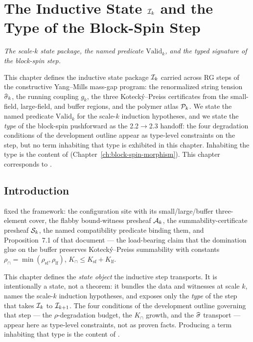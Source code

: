 %

\chapter{The Inductive State \texorpdfstring{$\mathcal{I}_k$}{I\_k}
  and the Type of the Block-Spin Step}
\label{ch:inductive-state}

\noindent\emph{The scale-$k$ state package, the named predicate
$\mathrm{Valid}_k$, and the typed signature of the block-spin step.}

This chapter defines the inductive state package $\mathcal{I}_k$ carried
across RG steps of the constructive Yang--Mills mass-gap program:
the renormalized string tension $\widehat{\sigma}_k$, the running coupling
$g_k$, the three Kotecký--Preiss certificates from the small-field,
large-field, and buffer regions, and the polymer atlas $\mathcal{P}_k$.
We state the named predicate $\mathrm{Valid}_k$ for the scale-$k$
induction hypotheses, and we state the \emph{type} of the block-spin
pushforward as the 2.2$\to$2.3 handoff: the four degradation
conditions of the development outline appear as type-level
constraints on the step, but no term inhabiting that type is
exhibited in this chapter.  Inhabiting the type is the content of
 (Chapter~\ref{ch:block-spin-morphism}).  This chapter
corresponds to .

\section{Introduction}
\label{sec:inductive-intro}

 fixed the framework: the configuration site with its small/large/buffer three-element cover, the flabby bound-witness presheaf $\mathcal{A}_k$, the summability-certificate presheaf $\mathcal{S}_k$, the named compatibility predicate binding them, and Proposition~7.1 of that document --- the load-bearing claim that the domination glue on the buffer preserves Kotecký--Preiss summability with constants $\rho_{\cap} = \min(\rho_{\mathrm{sf}}, \rho_{\mathrm{lf}})$, $K_{\cap} \le K_{\mathrm{sf}} + K_{\mathrm{lf}}$.

This chapter defines the \emph{state object} the inductive step transports.  It is intentionally a state, not a theorem: it bundles the data and witnesses at scale $k$, names the scale-$k$ induction hypotheses, and exposes only the \emph{type} of the step that takes $\mathcal{I}_k$ to $\mathcal{I}_{k+1}$.  The four conditions of the development outline governing that step --- the $\rho$-degradation budget, the $K_{\cap}$ growth, and the $\widehat{\sigma}$ transport --- appear here as type-level constraints, not as proven facts.  Producing a term inhabiting that type is the content of .

